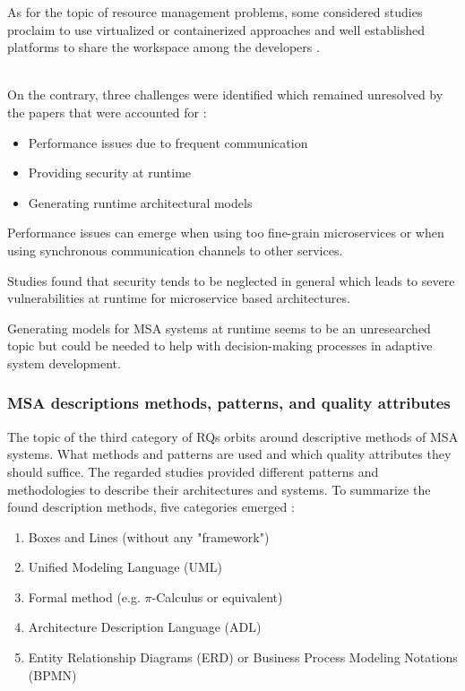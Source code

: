 As for the topic of resource management problems, some considered
studies proclaim to use virtualized or containerized approaches
and well established platforms to share the workspace among
the developers \cite{waseem:SMSMSADevOps}.

~\\
On the contrary, three challenges were identified which
remained unresolved by the papers that were accounted for \cite{waseem:SMSMSADevOps}:

\begin{itemize}
    \item Performance issues due to frequent communication
    \item Providing security at runtime
    \item Generating runtime architectural models
\end{itemize}

Performance issues can emerge when using too fine-grain microservices
or when using synchronous communication channels to other services.

Studies found that security tends to be neglected in general which leads
to severe vulnerabilities at runtime for microservice based architectures.

Generating models for MSA systems at runtime seems to be an unresearched
topic but could be needed to help with decision-making processes in
adaptive system development.

\subsubsection{MSA descriptions methods, patterns, and quality attributes}

The topic of the third category of RQs orbits around descriptive methods
of MSA systems. What methods and patterns are used and which
quality attributes they should suffice. The regarded studies provided
different patterns and methodologies to describe their architectures
and systems. To summarize the found description methods, five categories
emerged \cite{waseem:SMSMSADevOps}:

\begin{enumerate}
    \item Boxes and Lines (without any "framework")
    \item Unified Modeling Language (UML)
    \item Formal method (e.g. $\pi$-Calculus or equivalent)
    \item Architecture Description Language (ADL)
    \item Entity Relationship Diagrams (ERD) or Business
          Process Modeling Notations (BPMN)
\end{enumerate}


